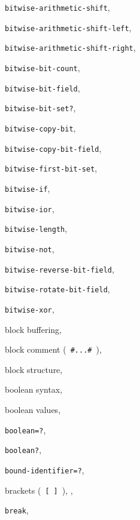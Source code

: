 {\begin{multicols}{2}
\texttt{bitwise-arithmetic-shift}, \textit{\pageref{objects_s144}}
  
\texttt{bitwise-arithmetic-shift-left}, \textit{\pageref{objects_s143}}
  
\texttt{bitwise-arithmetic-shift-right}, \textit{\pageref{objects_s143}}
  
\texttt{bitwise-bit-count}, \textit{\pageref{objects_s136}}
  
\texttt{bitwise-bit-field}, \textit{\pageref{objects_s141}}
  
\texttt{bitwise-bit-set?}, \textit{\pageref{objects_s139}}
  
\texttt{bitwise-copy-bit}, \textit{\pageref{objects_s140}}
  
\texttt{bitwise-copy-bit-field}, \textit{\pageref{objects_s142}}
  
\texttt{bitwise-first-bit-set}, \textit{\pageref{objects_s138}}
  
\texttt{bitwise-if}, \textit{\pageref{objects_s135}}
  
\texttt{bitwise-ior}, \textit{\pageref{objects_s134}}
  
\texttt{bitwise-length}, \textit{\pageref{objects_s137}}
  
\texttt{bitwise-not}, \textit{\pageref{objects_s134}}
  
\texttt{bitwise-reverse-bit-field}, \textit{\pageref{objects_s146}}
  
\texttt{bitwise-rotate-bit-field}, \textit{\pageref{objects_s145}}
  
\texttt{bitwise-xor}, \textit{\pageref{objects_s134}}
  
block buffering, \pageref{io_s17}
  
block comment ( \texttt{\#{}\textbar{}...\textbar{}\#{}} ), \pageref{grammar_s11}
  
block structure, \pageref{intro_s13}
  
boolean syntax, \pageref{grammar_s14}
  
boolean values, \pageref{intro_s35}
  
\texttt{boolean=?}, \textit{\pageref{objects_s271}}
  
\texttt{boolean?}, \textit{\pageref{objects_s14}}
  
\texttt{bound-identifier=?}, \textit{\pageref{syntax_s37}}
  
brackets ( \texttt{[} \texttt{]} ), \pageref{intro_s34}, \pageref{objects_s34}
  
\texttt{break}, \pageref{syntax_s47}
  

\end{multicols}}
